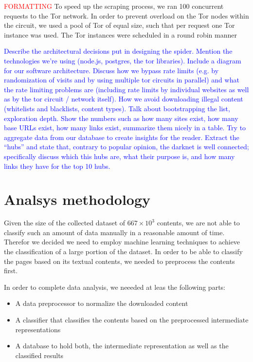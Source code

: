 \documentclass[USenglish,oneside,twocolumn]{article}
\newcommand\TODO[1]{\textcolor{red}{#1}}
\newcommand\CONTENT[1]{\textcolor{blue}{#1}}
\begin{document}
\TODO{FORMATTING}
To speed up the scraping process, we ran 100 concurrent requests to the Tor network. In order to prevent overload on the Tor nodes within the circuit, we used a pool of Tor of equal size, such that per request one Tor instance was used. The Tor instances were scheduled in a round robin manner 

\CONTENT{Describe the architectural decisions put in designing the spider. Mention the technologies we’re using (node.js, postgres, the tor libraries). Include a diagram for our software architecture. Discuss how we bypass rate limits (e.g. by randomization of visits and by using multiple tor circuits in parallel) and what the rate limiting problems are (including rate limits by individual websites as well as by the tor circuit / network itself). How we avoid downloading illegal content (whitelists and blacklists, content types). Talk about bootstrapping the list, exploration depth. Show the numbers such as how many sites exist, how many base URLs exist, how many links exist, summarize them nicely in a table. Try to aggregate data from our database to create insights for the reader. Extract the “hubs” and state that, contrary to popular opinion, the darknet is well connected; specifically discuss which this hubs are, what their purpose is, and how many links they have for the top 10 hubs.}


\section{Analsys methodology}
Given the size of the collected dataset of $667\times10^{3}$ contents, we are not able to classify such an amount of data manually in a reasonable amount of time. Therefor we decided we need to employ machine learning techniques to achieve the classification of a large portion of the dataset. In order to be able to classify the pages based on its textual contents, we needed to preprocess the contents first.

In order to complete data analysis, we neeeded at leas the following parts:
\begin{itemize}
    \item A data preprocessor to normalize the downloaded content
    \item A classifier that classifies the contents based on the preprocessed intermediate representations
    \item A database to hold both, the intermediate representation as well as the classified results
\end{itemize}
\end{document}
